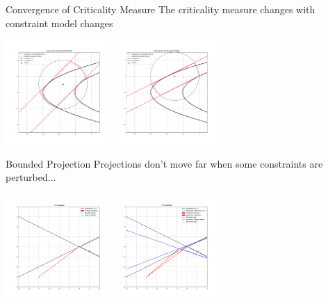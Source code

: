 \documentclass{beamer}
\begin{document}
\begin{frame}{Convergence of Criticality Measure}
	The criticality measure changes with constraint model changes
	\begin{center}
		\includegraphics[width=150px]{images/modeled_constraints_2.png}
		\includegraphics[width=150px]{images/modeled_constraints_3.png}
	\end{center}
\end{frame}




\begin{frame}{Bounded Projection}
	Projections don't move far when some constraints are perturbed...
	\begin{center}
		\includegraphics[width=150px]{images/hoffman_0.png}
		\includegraphics[width=150px]{images/hoffman_1.png}
	\end{center}
\end{frame}
\end{document}
